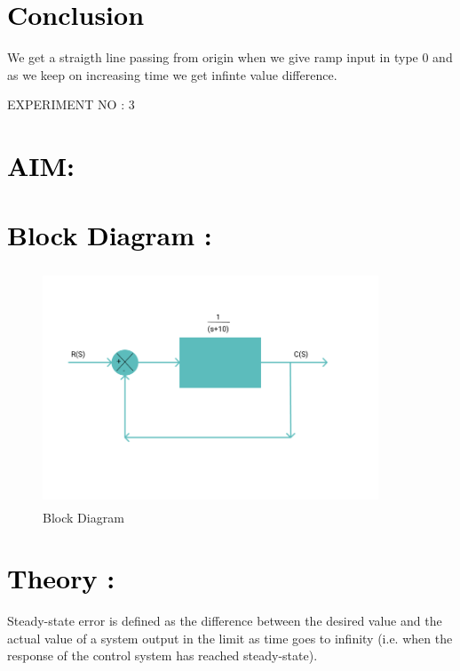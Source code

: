 \documentclass[12pt]{article}
\begin{document}
\section*{\textcolor{black}{Conclusion}}
We get a straigth line passing from origin when we give ramp input in type
0 and as we keep on increasing time we get infinte value difference.
\pagebreak
 
 
 
\begin{center}
    \LARGE {EXPERIMENT NO : 3}
             
\end{center}

\section*{\textcolor{black}{AIM: }}

\section*{\textcolor{black}{Block Diagram :}}
\begin{figure}[!hth]
        \centering
        \includegraphics[width =10cm, height = 7cm]{images/exp3.png}
        \caption{Block Diagram}
        \label{Graph}
\end{figure}
\section*{\textcolor{black}{Theory :}}
Steady-state error is defined as the difference between the desired value and the actual value of a system output in the limit as time goes to infinity (i.e. when the response of the control system has reached steady-state).\par
\end{document}
